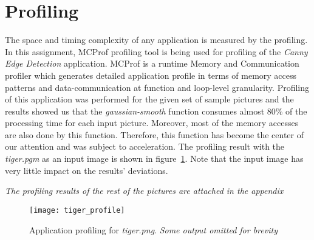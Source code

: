 \section{Profiling}
\label{sec:profiling}
The space and timing complexity of any application is measured by the profiling. In this assignment, MCProf profiling tool is being used for profiling of the  \emph{Canny Edge Detection} application. MCProf is a runtime Memory and Communication profiler which generates detailed application profile in terms of memory access patterns and data-communication at function and loop-level granularity. Profiling of this application was performed for the given set of sample pictures and the results showed us that the \emph{gaussian-smooth} function consumes almost 80\% of the processing time for each input picture. Moreover, most of the memory accesses are also done by this function. Therefore, this function has become the center of our attention and was subject to acceleration. The profiling result with the \emph{tiger.pgm} as an input image is shown in figure~\ref{fig:prof}. Note that the input image has very little impact on the results' deviations.



\textit{The profiling results of the rest of the pictures are attached in the appendix}


\begin{figure}
\centering
\texttt{[image: tiger\_profile]}
\caption{Application profiling for \textit{tiger.png}. \textit{Some output omitted for brevity}}
\label{fig:prof}
\end{figure}